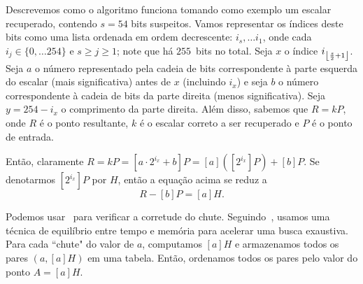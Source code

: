 \documentclass{SBCbookchapter}
\DeclarePairedDelimiter\floor{\lfloor}{\rfloor}
\begin{document}
Descrevemos como o algoritmo funciona tomando como exemplo um escalar recuperado, contendo $s=54$ bits suspeitos. Vamos representar os índices deste bits como uma lista ordenada em ordem decrescente: $i_s, \dots i_1$,
onde cada $i_j \in \{0, \dots 254\}$ e $s \ge j \ge 1$; note que há $255$~bits no total. Seja $x$ o índice $i_{\floor*{\frac{s}{2} + 1}}$.
Seja $a$ o número representado pela cadeia de bits correspondente à parte esquerda do escalar (mais significativa) antes de $x$ (incluindo $i_x$) e seja $b$ o número correspondente à cadeia de bits da parte direita (menos significativa).
Seja $y=254-i_x$ o comprimento da parte direita. Além disso, sabemos que $R = k P$,
onde $R$ é o ponto resultante, $k$ é o escalar correto a ser recuperado e $P$ é o ponto de entrada.


Então, claramente $R = k P = [a \cdot 2^{i_x} + b] P = [a] ([2^{i_x}] P) + [b] P$. 
Se denotarmos $[2^{i_x}] P$ por $H$, então a equação acima se reduz a
\begin{equation}\label{eq:check}
R - [b] P = [a] H.
\end{equation}


Podemos usar~ para verificar a corretude do chute. Seguindo~\cite{Gopalakrishnan2007}, usamos uma técnica de equilíbrio entre tempo e memória para acelerar uma busca exaustiva.
Para cada ``chute" do valor de $a$, computamos $[a] H$ e armazenamos todos os pares $(a, [a] H)$ em uma tabela. Então, ordenamos todos os pares pelo valor do ponto $A = [a] H$.
\end{document}

